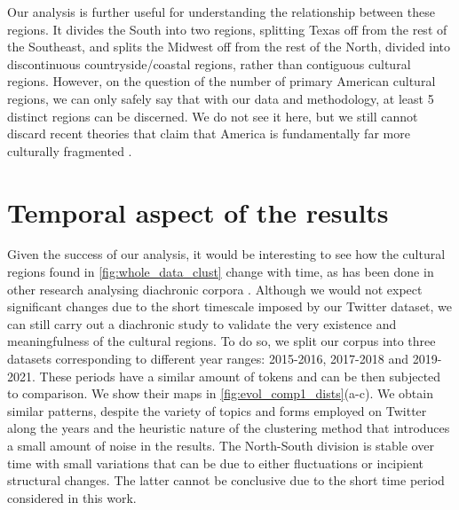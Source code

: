 \documentclass[../thesis.tex]{subfiles}
\begin{document}
Our analysis is further useful for understanding the relationship between these regions.
It divides the South into two regions, splitting Texas off from the rest of the
Southeast, and splits the Midwest off from the rest of the North, divided into
discontinuous countryside/coastal regions, rather than contiguous cultural regions.
However, on the question of the number of primary American cultural regions, we can only
safely say that with our data and methodology, at least 5 distinct regions can be
discerned. We do not see it here, but we still cannot discard recent theories that claim
that America is fundamentally far more culturally fragmented
\cite{GarreauNineNations1996,LieskeRegionalSubcultures1993,WoodardAmericanNations2012}.


\section{Temporal aspect of the results}
Given the success of our analysis, it would be interesting to see how the cultural
regions found in \cref{fig:whole_data_clust} change with time, as has been done in other
research analysing diachronic corpora
\cite{BochkarevAverageWord2015,BentleyBooksAverage2014,KarjusQuantifyingDynamics2020,MomeniModelingEvolution2018,AlshaabiStorywranglerMassive2021}.
Although we would not expect significant changes due to the short timescale imposed by
our Twitter dataset, we can still carry out a diachronic study to validate the very
existence and meaningfulness of the cultural regions. To do so, we split our corpus into
three datasets corresponding to different year ranges: 2015-2016, 2017-2018 and
2019-2021. These periods have a similar amount of tokens and can be then subjected to
comparison. We show their maps in
\cref{fig:evol_comp1_dists}(a-c). We obtain similar patterns, despite the variety of
topics and forms employed on Twitter along the years and the heuristic nature of the
clustering method that introduces a small amount of noise in the results. The
North-South division is stable over time with small variations that can be due to either
fluctuations or incipient structural changes. The latter cannot be conclusive due to the
short time period considered in this work.
\end{document}
